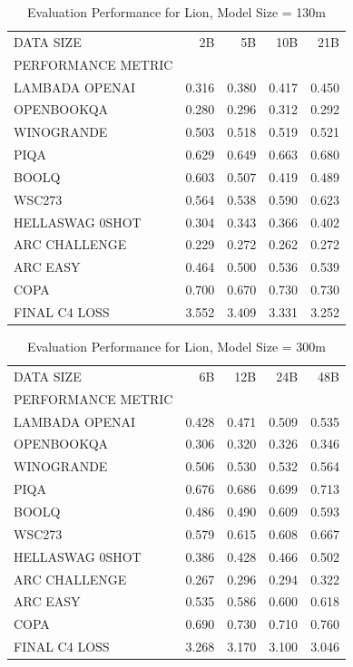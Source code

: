 \begin{table}
[H] \centering \caption{Evaluation Performance for Lion, Model Size = 130m}
\label{tab:eval-performance-lion-130M}
\begin{tabular}{lrrrr}
\toprule
DATA SIZE & 2B & 5B & 10B & 21B \\
PERFORMANCE METRIC &  &  &  &  \\
\midrule
LAMBADA OPENAI & 0.316 & 0.380 & 0.417 & 0.450 \\
OPENBOOKQA & 0.280 & 0.296 & 0.312 & 0.292 \\
WINOGRANDE & 0.503 & 0.518 & 0.519 & 0.521 \\
PIQA & 0.629 & 0.649 & 0.663 & 0.680 \\
BOOLQ & 0.603 & 0.507 & 0.419 & 0.489 \\
WSC273 & 0.564 & 0.538 & 0.590 & 0.623 \\
HELLASWAG 0SHOT & 0.304 & 0.343 & 0.366 & 0.402 \\
ARC CHALLENGE & 0.229 & 0.272 & 0.262 & 0.272 \\
ARC EASY & 0.464 & 0.500 & 0.536 & 0.539 \\
COPA & 0.700 & 0.670 & 0.730 & 0.730 \\
FINAL C4 LOSS & 3.552 & 3.409 & 3.331 & 3.252 \\
\bottomrule
\end{tabular}
\end{table}


\begin{table}
[H] \centering \caption{Evaluation Performance for Lion, Model Size = 300m}
\label{tab:eval-performance-lion-300M}
\begin{tabular}{lrrrr}
\toprule
DATA SIZE & 6B & 12B & 24B & 48B \\
PERFORMANCE METRIC &  &  &  &  \\
\midrule
LAMBADA OPENAI & 0.428 & 0.471 & 0.509 & 0.535 \\
OPENBOOKQA & 0.306 & 0.320 & 0.326 & 0.346 \\
WINOGRANDE & 0.506 & 0.530 & 0.532 & 0.564 \\
PIQA & 0.676 & 0.686 & 0.699 & 0.713 \\
BOOLQ & 0.486 & 0.490 & 0.609 & 0.593 \\
WSC273 & 0.579 & 0.615 & 0.608 & 0.667 \\
HELLASWAG 0SHOT & 0.386 & 0.428 & 0.466 & 0.502 \\
ARC CHALLENGE & 0.267 & 0.296 & 0.294 & 0.322 \\
ARC EASY & 0.535 & 0.586 & 0.600 & 0.618 \\
COPA & 0.690 & 0.730 & 0.710 & 0.760 \\
FINAL C4 LOSS & 3.268 & 3.170 & 3.100 & 3.046 \\
\bottomrule
\end{tabular}
\end{table}


